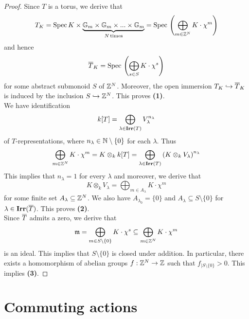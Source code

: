 \begin{proof}
Since $T$ is a torus, we derive that
$$T_K = \mathrm{Spec}\, K \times \underbrace{\mathbb{G}_{m}\times \mathbb{G}_{m}\times ...\times \mathbb{G}_{m}}_{N\,\mathrm{times}} = \mathrm{Spec}\, \left(\bigoplus_{m\in {\mathbb Z}^N}K\cdot \chi^m\right)$$
and hence
$$\overline{T}_K = \mathrm{Spec}\, \left(\bigoplus_{s\in S}K\cdot \chi^s\right)$$
for some abstract submonoid $S$ of ${\mathbb Z}^N$. Moreover, the open immersion $T_K\hookrightarrow \overline{T}_K$ is induced by the inclusion $S \hookrightarrow {\mathbb Z}^N$. This proves \textbf{(1)}.\\
We have identification
$$k[T] = \bigoplus_{\lambda\in \mathbf{Irr}(T)}V_{\lambda}^{n_{\lambda}}$$
of $T$-representations, where $n_{\lambda}\in {\mathbb N}\setminus \{0\}$ for each $\lambda$. Thus
$$\bigoplus_{m\in {\mathbb Z}^N}K\cdot \chi^m = K\otimes_kk[T] = \bigoplus_{\lambda\in \mathbf{Irr}(T)}\left(K\otimes_kV_{\lambda}\right)^{n_{\lambda}}$$
This implies that $n_{\lambda} = 1$ for every $\lambda$ and moreover, we derive that
$$K\otimes_kV_{\lambda} = \bigoplus_{m\in A_{\lambda}}K\cdot \chi^m$$
for some finite set $A_{\lambda}\subseteq {\mathbb Z}^N$. We also have $A_{\lambda_0} = \{0\}$ and $A_{\lambda}\subseteq S\setminus \{0\}$ for $\lambda \in \mathbf{Irr}(\overline{T})$. This proves \textbf{(2)}.\\
Since $\overline{T}$ admits a zero, we derive that
$$\mathfrak{m} = \bigoplus_{m \in S\setminus\{0\}}K\cdot \chi^s \subseteq \bigoplus_{m\in {\mathbb Z}^N}K\cdot \chi^m$$
is an ideal. This implies that $S\setminus \{0\}$ is closed under addition. In particular, there exists a homomorphism of abelian groups $f:{\mathbb Z}^N\rightarrow {\mathbb Z}$ such that $f_{\mid S\setminus \{0\}}>0$. This implies \textbf{(3)}.
\end{proof}

\section{Commuting actions}

